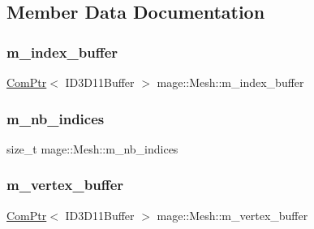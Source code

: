\subsection{Member Data Documentation}
\hypertarget{classmage_1_1_mesh_abe29363ebac77b284ca69532fd5b3373}{}\label{classmage_1_1_mesh_abe29363ebac77b284ca69532fd5b3373} 
\subsubsection{\texorpdfstring{m\+\_\+index\+\_\+buffer}{m\_index\_buffer}}
{\footnotesize\ttfamily \hyperlink{namespacemage_ae74f374780900893caa5555d1031fd79}{Com\+Ptr}$<$ I\+D3\+D11\+Buffer $>$ mage\+::\+Mesh\+::m\+\_\+index\+\_\+buffer\hspace{0.3cm}{\ttfamily [protected]}}

\hypertarget{classmage_1_1_mesh_a5e3baa9e2b2e9b4ce795a456f76d87b2}{}\label{classmage_1_1_mesh_a5e3baa9e2b2e9b4ce795a456f76d87b2} 
\subsubsection{\texorpdfstring{m\+\_\+nb\+\_\+indices}{m\_nb\_indices}}
{\footnotesize\ttfamily size\+\_\+t mage\+::\+Mesh\+::m\+\_\+nb\+\_\+indices\hspace{0.3cm}{\ttfamily [protected]}}

\hypertarget{classmage_1_1_mesh_af5ae74887eb330201829477cf772ba6e}{}\label{classmage_1_1_mesh_af5ae74887eb330201829477cf772ba6e} 
\subsubsection{\texorpdfstring{m\+\_\+vertex\+\_\+buffer}{m\_vertex\_buffer}}
{\footnotesize\ttfamily \hyperlink{namespacemage_ae74f374780900893caa5555d1031fd79}{Com\+Ptr}$<$ I\+D3\+D11\+Buffer $>$ mage\+::\+Mesh\+::m\+\_\+vertex\+\_\+buffer\hspace{0.3cm}{\ttfamily [protected]}}

